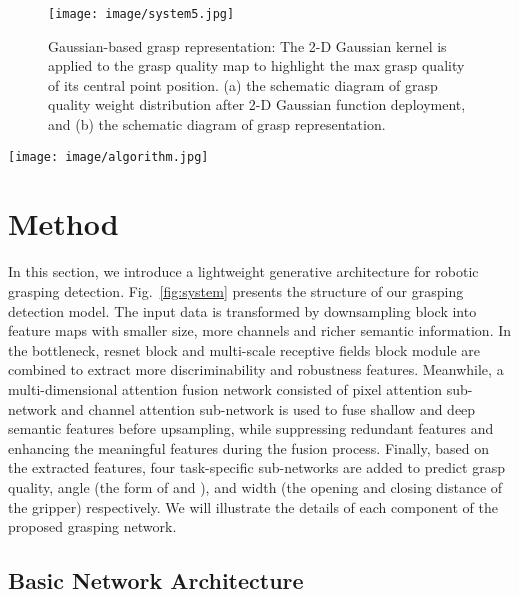 \documentclass[journal]{IEEEtran}
\begin{document}
\begin{figure}[t!]
{\texttt{[image: image/system5.jpg]}}
	\caption{Gaussian-based grasp representation: The 2-D Gaussian kernel is applied to the grasp quality map to highlight the max grasp quality of its central point position. (a) the schematic diagram of grasp quality weight distribution after 2-D Gaussian function deployment, and (b) the schematic diagram of grasp representation.}
	\label{fig:Hardware}
\end{figure} 


\begin{figure*}[t!]
	\centering 
	\setlength{\belowcaptionskip}{-10pt}       
	{\texttt{[image: image/algorithm.jpg]}}
	\caption{The structure of our lightweight generative grasping detection algorithm. I and Conv denote the input data and covolution filter, respectively. The proposed method consisits of the downsampling block, the bottleneck layer, the multi-dimensional attention fusion network and the upsampling block.}
	\label{fig:system}
\end{figure*} 

\section{Method}
\label{sec:GraspingProposalsDetection}
In this section, we introduce a lightweight generative architecture for robotic grasping detection. Fig.~\ref{fig:system} presents the structure of our grasping detection model. The input data is transformed by downsampling block into feature maps with smaller size, more channels and richer semantic information. In the bottleneck, resnet block and multi-scale receptive fields block module are combined to extract more discriminability and robustness features. Meanwhile, a multi-dimensional attention fusion network consisted of pixel attention sub-network and channel attention sub-network is used to fuse shallow and deep semantic features before upsampling, while suppressing redundant features and enhancing the meaningful features during the fusion process. Finally, based on the extracted features, four task-specific sub-networks are added to predict grasp quality, angle (the form of  and ), and width (the opening and closing distance of the gripper) respectively. We will illustrate the details of each component of the proposed grasping network.


\subsection{Basic Network Architecture}
\end{document}

